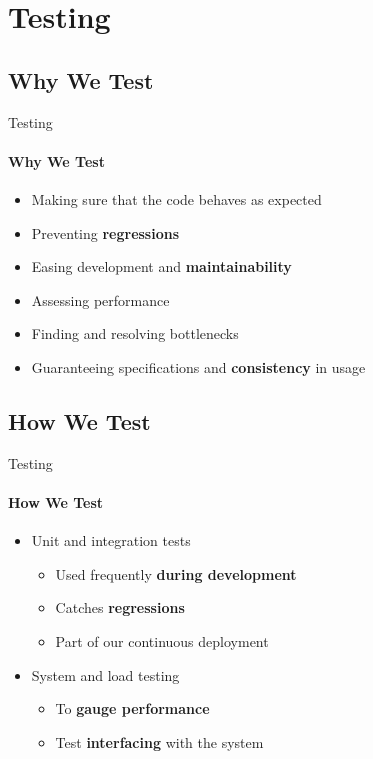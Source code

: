 \section{Testing}
\author{Mathias}
\subsection{Why We Test}

\begin{frame}{Testing}
    \framesubtitle{Why We Test}
    \begin{itemize}
        \item Making sure that the code behaves as expected
        \item Preventing \textbf{regressions}
        \item Easing development and \textbf{maintainability}
        \item Assessing performance
        \item Finding and resolving bottlenecks
        \item Guaranteeing specifications and \textbf{consistency} in usage
    \end{itemize}
\end{frame}

\subsection{How We Test}
\begin{frame}{Testing}
    \framesubtitle{How We Test}
    \begin{itemize}
        \item<1-> Unit and integration tests
            \begin{itemize}
                \item Used frequently \textbf{during development}
                \item Catches \textbf{regressions}
                \item Part of our continuous deployment
            \end{itemize}
        \item<2-> System and load testing
            \begin{itemize}
                \item To \textbf{gauge performance}
                \item Test \textbf{interfacing} with the system
            \end{itemize}
    \end{itemize}
\end{frame}
